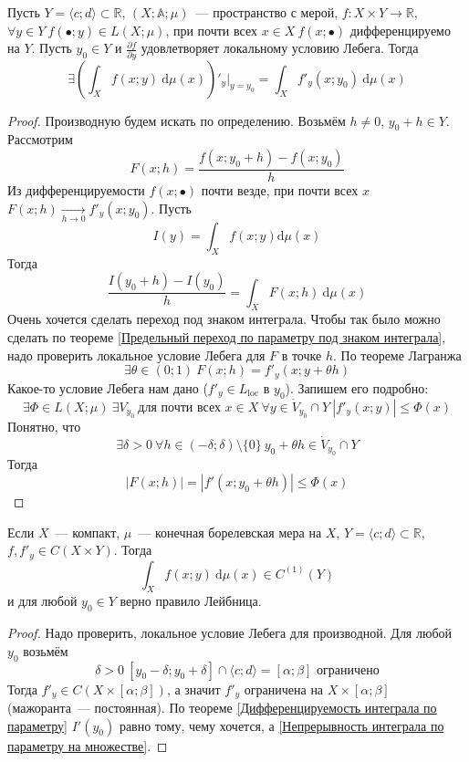 \documentclass{article}
\begin{document}
    \begin{theorem}
        \label{Дифференцируемость интеграла по параметру}
        Пусть $Y=\langle c;d\rangle\subset\mathbb R$, $(X;\mathbb A;\mu)$~--- пространство с мерой, $f\colon X\times Y\to\mathbb R$, $\forall y\in Y~f(\bullet;y)\in L(X;\mu)$, при почти всех $x\in X~f(x;\bullet)$ дифференцируемо на $Y$. Пусть $y_0\in Y$ и $\frac{\partial f}{\partial y}$ удовлетворяет локальному условию Лебега. Тогда
        $$
        \exists\left(\int_X f(x;y)~\mathrm d\mu(x)\right)'_y\bigg|_{y=y_0}=\int_Xf'_y(x;y_0)~\mathrm d\mu(x)
        $$
    \end{theorem}
    \begin{proof}
        Производную будем искать по определению. Возьмём $h\neq0$, $y_0+h\in Y$. Рассмотрим
        $$
        F(x;h)=\frac{f(x;y_0+h)-f(x;y_0)}h
        $$
        Из дифференцируемости $f(x;\bullet)$ почти везде, при почти всех $x$ $F(x;h)\underset{h\to0}\longrightarrow f'_y(x;y_0)$. Пусть
        $$
        I(y)=\int_Xf(x;y)\mathrm d\mu(x)
        $$
        Тогда
        $$
        \frac{I(y_0+h)-I(y_0)}h=\int_XF(x;h)~\mathrm d\mu(x)
        $$
        Очень хочется сделать переход под знаком интеграла. Чтобы так было можно сделать по теореме \ref{Предельный переход по параметру под знаком интеграла}, надо проверить локальное условие Лебега для $F$ в точке $h$. По теореме Лагранжа
        $$
        \exists\theta\in(0;1)~F(x;h)=f'_y(x;y+\theta h)
        $$
        Какое-то условие Лебега нам дано ($f'_y\in L_{\mathrm{loc}}$ в $y_0$). Запишем его подробно:
        $$
        \exists\Phi\in L(X;\mu)~\exists V_{y_0}~\text{для почти всех }x\in X~\forall y\in{\dot V}_{y_0}\cap Y~|f'_y(x;y)|\leqslant\Phi(x)
        $$
        Понятно, что
        $$
        \exists\delta>0~\forall h\in(-\delta;\delta)\setminus\{0\}~y_0+\theta h\in{\dot V}_{y_0}\cap Y
        $$
        Тогда
        $$
        |F(x;h)|=|f'(x;y_0+\theta h)|\leqslant\Phi(x)
        $$
    \end{proof}
    \begin{corollary}
        Если $X$~--- компакт, $\mu$~--- конечная борелевская мера на $X$, $Y=\langle c;d\rangle\subset\mathbb R$, $f,f'_y\in C(X\times Y)$. Тогда
        $$
        \int_X f(x;y)~\mathrm d\mu(x)\in C^{(1)}(Y)
        $$
        и для любой $y_0\in Y$ верно правило Лейбница.
    \end{corollary}
    \begin{proof}
        Надо проверить, локальное условие Лебега для производной. Для любой $y_0$ возьмём 
        $$
        \delta>0~[y_0-\delta;y_0+\delta]\cap\langle c;d\rangle=[\alpha;\beta]\text{ ограничено}
        $$
        Тогда $f'_y\in C(X\times[\alpha;\beta])$, а значит $f'_y$ ограничена на $X\times[\alpha;\beta]$ (мажоранта~--- постоянная). По теореме \ref{Дифференцируемость интеграла по параметру} $I'(y_0)$ равно тому, чему хочется, а \ref{Непрерывность интеграла по параметру на множестве}.
    \end{proof}
\end{document}

